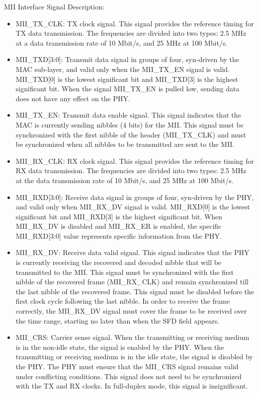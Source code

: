 \documentclass[main\_\_EN.tex]{subfiles}
\begin{document}
MII Interface Signal Description:
\begin{itemize}
    \item MII\_TX\_CLK: TX clock signal. This signal provides the reference timing for TX data transmission. The frequencies are divided into two types: 2.5 MHz at a data transmission rate of 10 Mbit/s, and 25 MHz at 100 Mbit/s.
    \item MII\_TXD[3:0]: Transmit data signal in groups of four, syn-driven by the MAC sub-layer, and valid only when the MII\_TX\_EN signal is valid. MII\_TXD[0] is the lowest significant bit and MII\_TXD[3] is the highest significant bit. When the signal MII\_TX\_EN is pulled low, sending data does not have any effect on the PHY.
    \item MII\_TX\_EN: Transmit data enable signal. This signal indicates that the MAC is currently sending nibbles (4 bits) for the MII. This signal must be synchronized with the first nibble of the header (MII\_TX\_CLK) and must be synchronized when all nibbles to be transmitted are sent to the MII.
    \item MII\_RX\_CLK: RX clock signal. This signal provides the reference timing for RX data transmission. The frequencies are divided into two types: 2.5 MHz at the data transmission rate of 10 Mbit/s, and 25 MHz at 100 Mbit/s.
    \item MII\_RXD[3:0]: Receive data signal in groups of four, syn-driven by the PHY, and valid only when MII\_RX\_DV signal is valid. MII\_RXD[0] is the lowest significant bit and MII\_RXD[3] is the highest significant bit. When MII\_RX\_DV is disabled and MII\_RX\_ER is enabled, the specific MII\_RXD[3:0] value represents specific information from the PHY.
    \item MII\_RX\_DV: Receive data valid signal. This signal indicates that the PHY is currently receiving the recovered and decoded nibble that will be transmitted to the MII. This signal must be synchronized with the first nibble of the recovered frame (MII\_RX\_CLK) and remain synchronized till the last nibble of the recovered frame. This signal must be disabled before the first clock cycle following the last nibble. In order to receive the frame correctly, the MII\_RX\_DV signal must cover the frame to be received over the time range, starting no later than when the SFD field appears.
    \item MII\_CRS: Carrier sense signal. When the transmitting or receiving medium is in the non-idle state, the signal is enabled by the PHY. When the transmitting or receiving medium is in the idle state, the signal is disabled by the PHY. The PHY must ensure that the MII\_CRS signal remains valid under conflicting conditions. This signal does not need to be synchronized with the TX and RX clocks. In full-duplex mode, this signal is insignificant.

\end{itemize}
\end{document}
